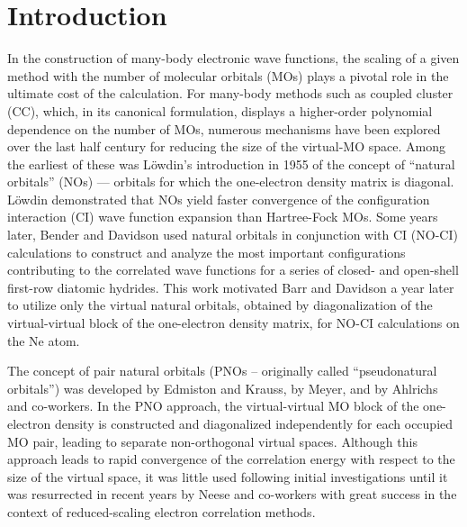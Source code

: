 \documentclass[journal=jpccck,manuscript=article]{achemso}
\begin{document}
\section{Introduction}
In the construction of many-body electronic wave functions, the scaling of a
given method with the number of molecular orbitals (MOs) plays a pivotal role
in the ultimate cost of the calculation.  For many-body methods such as
coupled cluster (CC),\cite{Shavitt09,Gauss98,Crawford00:review} which, in its
canonical formulation, displays a higher-order polynomial dependence on the
number of MOs, numerous mechanisms have been explored over the last half
century for reducing the size of the virtual-MO space.  Among the earliest of
these was L{\"o}wdin's\cite{Lowdin55} introduction in 1955 of the concept of
``natural orbitals'' (NOs) --- orbitals for which the one-electron density
matrix is diagonal.  L\"owdin demonstrated that NOs yield faster convergence
of the configuration interaction (CI) wave function expansion than Hartree-Fock MOs.  Some years later,
Bender and Davidson\cite{Bender69} used natural orbitals in conjunction with
CI (NO-CI) calculations to construct and analyze the most important
configurations contributing to the correlated wave functions for a series of
closed- and open-shell first-row diatomic hydrides.  This work motivated Barr
and Davidson a year later\cite{Barr70} to utilize only the virtual natural
orbitals, obtained by diagonalization of the virtual-virtual block of
the one-electron density matrix, for NO-CI calculations on the Ne atom.

The concept of pair natural orbitals (PNOs -- originally called
``pseudonatural orbitals'') was developed by Edmiston and
Krauss,\cite{Edmiston66} by Meyer\cite{Meyer73}, and by Ahlrichs and
co-workers.\cite{Ahlrichs75} In the PNO approach, the virtual-virtual MO block
of the one-electron density is constructed and diagonalized independently for
each occupied MO pair, leading to separate non-orthogonal virtual spaces.
Although this approach leads to rapid convergence of the correlation energy
with respect to the size of the virtual space, it was little used following
initial investigations until it was resurrected in recent years by Neese and
co-workers with great success in the context of reduced-scaling electron
correlation methods.\cite{Neese09,Riplinger16}
\end{document}
